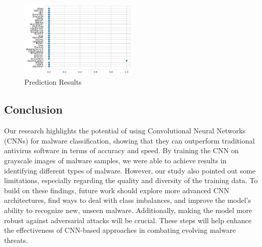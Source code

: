 \documentclass[conference]{IEEEtran}
\begin{document}
\begin{figure}[ht] %
  \centering %
  \includegraphics[width=0.5\textwidth]{PredictionResults.jpeg} %
  \caption{Prediction Results } %
  \label{fig:example7} %
\end{figure}

\setlength{\parskip}{10pt}

\subsection{Conclusion}
Our research highlights the potential of using Convolutional Neural Networks (CNNs) for malware classification, showing that they can outperform traditional antivirus software in terms of accuracy and speed. By training the CNN on grayscale images of malware samples, we were able to achieve results in identifying different types of malware. However, our study also pointed out some limitations, especially regarding the quality and diversity of the training data. To build on these findings, future work should explore more advanced CNN architectures, find ways to deal with class imbalances, and improve the model’s ability to recognize new, unseen malware. Additionally, making the model more robust against adversarial attacks will be crucial. These steps will help enhance the effectiveness of CNN-based approaches in combating evolving malware threats.
\end{document}
